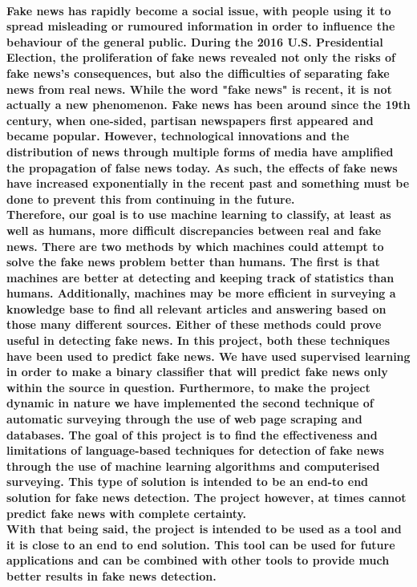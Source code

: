\documentclass[a4paper]{article}
\begin{document}
	\paragraph{\indent Fake news has rapidly become a social issue, with people using it to spread misleading or rumoured information in order to influence the behaviour of the general public. During the 2016 U.S. Presidential Election, the proliferation of fake news revealed not only the risks of fake news's consequences, but also the difficulties of separating fake news from real news. While the word "fake news" is recent, it is not actually a new phenomenon. Fake news has been around since the 19th century, when one-sided, partisan newspapers first appeared and became popular. However, technological innovations and the distribution of news through multiple forms of media have amplified the propagation of false news today. As such, the effects of fake news have increased exponentially in the recent past and something must be done to prevent this from continuing in the future.\\[\baselineskip]
		\indent Therefore, our goal is to use machine learning to classify, at least as well as humans, more difficult discrepancies between real and fake news. There are two methods by which machines could attempt to solve the fake news problem better than humans. The first is that machines are better at detecting and keeping track of statistics than humans. Additionally, machines may be more efficient in surveying a knowledge base to find all relevant articles and answering based on those many different sources. Either of these methods could prove useful in detecting fake news. In this project, both these techniques have been used to predict fake news. We have used supervised learning in order to make a binary classifier that will predict fake news only within the source in question. Furthermore, to make the project dynamic in nature we have implemented the second technique of automatic surveying through the use of web page scraping and databases. The goal of this project is to find the effectiveness and limitations of language-based techniques for detection of fake news through the use of machine learning algorithms and computerised surveying. This type of solution is intended to be an end-to end solution for fake news detection. The project however, at times cannot predict fake news with complete certainty. \\[\baselineskip]
		\indent With that being said, the project is intended to be used as a tool and it is close to an end to end solution. This tool can be used for future  applications and can be combined with other tools to provide much better results in fake news detection.
	}
	
\end{document}
